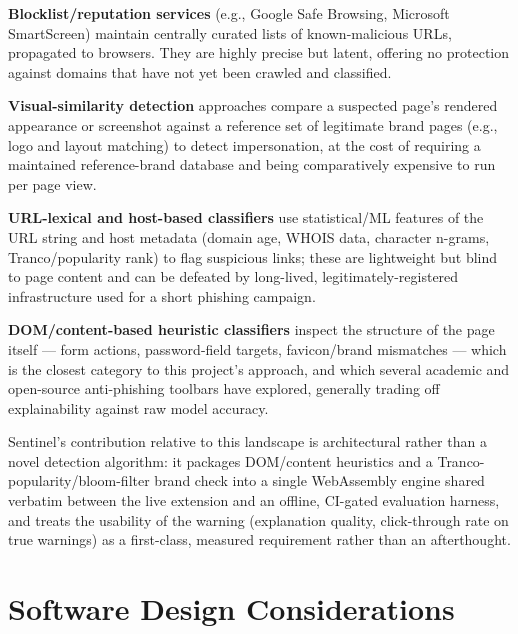 \documentclass[conference]{IEEEtran}
\begin{document}
\textbf{Blocklist/reputation services} (e.g., Google Safe Browsing, Microsoft SmartScreen) maintain centrally curated lists of known-malicious URLs, propagated to browsers. They are highly precise but latent, offering no protection against domains that have not yet been crawled and classified.

\textbf{Visual-similarity detection} approaches compare a suspected page's rendered appearance or screenshot against a reference set of legitimate brand pages (e.g., logo and layout matching) to detect impersonation, at the cost of requiring a maintained reference-brand database and being comparatively expensive to run per page view.

\textbf{URL-lexical and host-based classifiers} use statistical/ML features of the URL string and host metadata (domain age, WHOIS data, character n-grams, Tranco/popularity rank) to flag suspicious links; these are lightweight but blind to page content and can be defeated by long-lived, legitimately-registered infrastructure used for a short phishing campaign.

\textbf{DOM/content-based heuristic classifiers} inspect the structure of the page itself --- form actions, password-field targets, favicon/brand mismatches --- which is the closest category to this project's approach, and which several academic and open-source anti-phishing toolbars have explored, generally trading off explainability against raw model accuracy.

Sentinel's contribution relative to this landscape is architectural rather than a novel detection algorithm: it packages DOM/content heuristics and a Tranco-popularity/bloom-filter brand check into a single WebAssembly engine shared verbatim between the live extension and an offline, CI-gated evaluation harness, and treats the usability of the warning (explanation quality, click-through rate on true warnings) as a first-class, measured requirement rather than an afterthought.

\section{Software Design Considerations}
\end{document}
